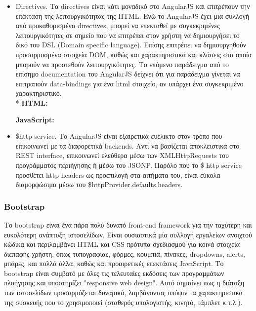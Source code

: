 \begin{itemize}
	\item Directives. Τα directives είναι κάτι μοναδικό στο AngularJS και επιτρέπουν την επέκταση της λειτουργικότητας της HTML. Ενώ το AngularJS έχει μια συλλογή από προκαθορισμένα directives, μπορεί να επεκταθεί με συγκεκριμένες λειτουργικότητες σε σημείο που να επιτρέπει στον χρήστη να δημιουργήσει το δικό του DSL (Domain specific language). Επίσης επιτρέπει να δημιουργηθούν προσαρμοσμένα στοιχεία DOM, καθώς και χαρακτηριστικά και κλάσεις στα οποία μπορούν να προστεθούν λειτουργικότητες. Το επόμενο παράδειγμα από το επίσημο documentation του AngularJS δείχνει ότι για παράδειγμα γίνεται να επιτραπούν data-bindings για ένα html στοιχείο, αν υπάρχει ένα συγκεκριμένο χαρακτηριστικό. \cite{angular-directives}
\\*
\textbf{HTML:}

	
 
\textbf{JavaScript:}

	


	\item \$http service. Το AngularJS είναι εξαιρετικά ευέλικτο στον τρόπο που επικοινωνεί με τα διαφορετικά backends. Αντί να βασίζεται αποκλειστικά στο REST interface, επικοινωνεί ελεύθερα μέσω των XMLHttpRequests του προγράμματος περιήγησης ή μέσω του JSONP. Παρόλο που το \$ http service προσθέτει http headers ως προεπιλογή στα αιτήματα του,  είναι εύκολα διαμορφώσιμα μέσω του \$httpProvider.defaults.headers.
	\end{itemize}




		\subsubsection{Bootstrap}
	Το bootstrap είναι ένα πάρα πολύ δυνατό front-end framework για την ταχύτερη και ευκολότερη ανάπτυξη ιστοσελίδων. Είναι ουσιαστικά μία συλλογή εργαλείων ανοιχτού κώδικα και περιλαμβάνει HTML και CSS πρότυπα σχεδιασμού για κοινά στοιχεία διεπαφής χρήστη, όπως τυπογραφίας, φόρμες, κουμπιά, πίνακες, dropdowns, alerts, μπάρες, και πολλά άλλα, καθώς και προαιρετικές επεκτάσεις JavaScript. Το bootstrap είναι συμβατό με όλες τις τελευταίες εκδόσεις των προγραμμάτων πλοήγησης και υποστηρίζει "responsive web design". Αυτό σημαίνει πως η διάταξη των ιστοσελίδων προσαρμόζεται δυναμικά, λαμβάνοντας υπόψιν τα χαρακτηριστικά της συσκευής που το χρησιμοποιεί (σταθερός υπολογιστής, κινητό, τάμπλετ κ.τ.λ.). 
	
